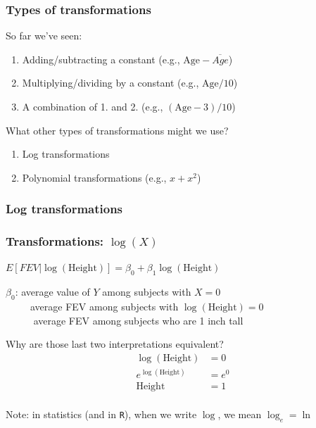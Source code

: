 \documentclass[12pt, 
hyperref={colorlinks=true, linkcolor=blue, urlcolor=cyan}]{beamer}
\begin{document}
\begin{frame}
\frametitle{Types of transformations}

So far we've seen:
\begin{enumerate}
\item Adding/subtracting a constant (e.g., $\text{Age} - \overline{Age}$)
\item Multiplying/dividing by a constant (e.g., $\text{Age}/10$)
\item A combination of 1. and 2. (e.g., $(\text{Age}-3)/10$)
\end{enumerate}

What other types of transformations might we use?
\begin{enumerate}
\item Log transformations
\item Polynomial transformations (e.g., $x + x^2$)
\end{enumerate}

\end{frame}

\subsubsection{Log transformations}
\begin{frame}
\frametitle{Transformations: $\log(X)$}
\begin{center} $E[FEV|\log(\text{Height})] = \beta_0 + \beta_1 \log(\text{Height})$ \end{center}

$\beta_0$: average value of $Y$ among subjects with $X = 0$\\ \pause 
\ \ \ \ \ average FEV among subjects with $\log(\text{Height}) = 0$\\ \pause 
\ \ \ \ \ \color{blue} average FEV among subjects who are 1 inch tall \color{black}  \pause

Why are those last two interpretations equivalent?
\begin{align*}
\log(\text{Height}) & = 0 \\
e^{\log(\text{Height})} & = e^0 \\
\text{Height} & = 1\\
\end{align*}
\begin{footnotesize} Note: in statistics (and in \texttt{R}), when we write $\log$, we mean $\log_e = \ln$ \end{footnotesize}
\end{frame}
\end{document}
